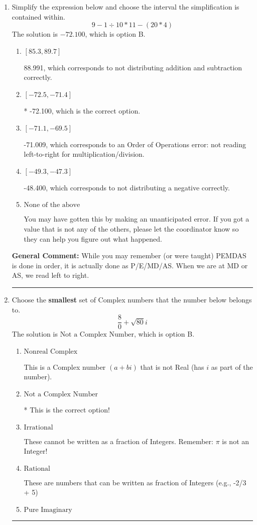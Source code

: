 \documentclass{extbook}[14pt]
\newcommand{\litem}[1]{\item #1

\rule{\textwidth}{0.4pt}}
\begin{document}
\begin{enumerate}\litem{
Simplify the expression below and choose the interval the simplification is contained within.
\[ 9 - 1 \div 10 * 11 - (20 * 4) \]The solution is \( -72.100 \), which is option B.\begin{enumerate}[label=\Alph*.]
\item \( [85.3, 89.7] \)

 88.991, which corresponds to not distributing addition and subtraction correctly.
\item \( [-72.5, -71.4] \)

* -72.100, which is the correct option.
\item \( [-71.1, -69.5] \)

 -71.009, which corresponds to an Order of Operations error: not reading left-to-right for multiplication/division.
\item \( [-49.3, -47.3] \)

 -48.400, which corresponds to not distributing a negative correctly.
\item \( \text{None of the above} \)

 You may have gotten this by making an unanticipated error. If you got a value that is not any of the others, please let the coordinator know so they can help you figure out what happened.
\end{enumerate}

\textbf{General Comment:} While you may remember (or were taught) PEMDAS is done in order, it is actually done as P/E/MD/AS. When we are at MD or AS, we read left to right.
}
\litem{
Choose the \textbf{smallest} set of Complex numbers that the number below belongs to.
\[ \frac{8}{0}+\sqrt{80} i \]The solution is \( \text{Not a Complex Number} \), which is option B.\begin{enumerate}[label=\Alph*.]
\item \( \text{Nonreal Complex} \)

This is a Complex number $(a+bi)$ that is not Real (has $i$ as part of the number).
\item \( \text{Not a Complex Number} \)

* This is the correct option!
\item \( \text{Irrational} \)

These cannot be written as a fraction of Integers. Remember: $\pi$ is not an Integer!
\item \( \text{Rational} \)

These are numbers that can be written as fraction of Integers (e.g., -2/3 + 5)
\item \( \text{Pure Imaginary} \)


\end{enumerate}}
\end{enumerate}
\end{document}

